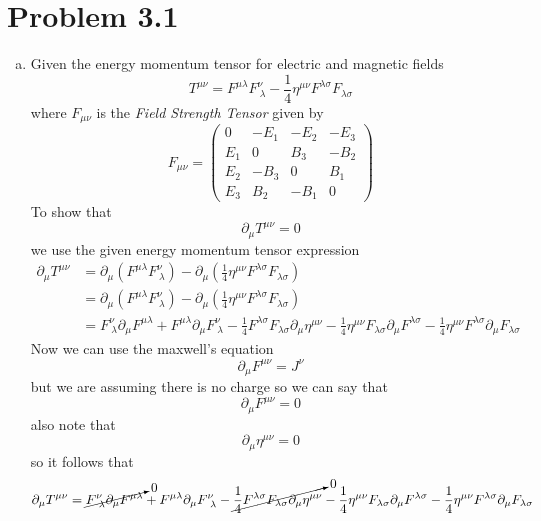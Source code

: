 \documentclass[11pt]{article}
\numberwithin{equation}{section}
\begin{document}


\section{Problem 3.1}
\begin{enumerate}[(a)]
\item
Given the energy momentum tensor for electric and magnetic fields
$$T^{\mu\nu} = F^{\mu\lambda}F^{\nu}_{\ \lambda} - \frac{1}{4}\eta^{\mu\nu}F^{\lambda\sigma}F_{\lambda\sigma}$$
where $F_{\mu\nu}$ is the \emph{Field Strength Tensor} given by
$$F_{\mu\nu} = \left(\begin{array}{cccc}
		0 &-E_1 &-E_2 &-E_3\\
		E_1 &0 &B_3 &-B_2\\
		E_2 &-B_3 &0 &B_1\\
		E_3 &B_2 &-B_1 &0
		\end{array}\right)$$
To show that 
$$\partial_{\mu}T^{\mu\nu} = 0$$
we use the given energy momentum tensor expression 
\begin{align*}
\partial_{\mu}T^{\mu\nu} &= \partial_{\mu}\left(F^{\mu\lambda}F^{\nu}_{\ \lambda}\right) - \partial_{\mu}\left(\frac{1}{4}\eta^{\mu\nu}F^{\lambda\sigma}F_{\lambda\sigma}\right)\\
&= \partial_{\mu}\left(F^{\mu\lambda}F^{\nu}_{\ \lambda}\right) - \partial_{\mu}\left(\frac{1}{4}\eta^{\mu\nu}F^{\lambda\sigma}F_{\lambda\sigma}\right)\\
&= F^{\nu}_{\ \lambda}\partial_{\mu}F^{\mu\lambda} + F^{\mu\lambda}\partial_{\mu}F^{\nu}_{\ \lambda} - \frac{1}{4}F^{\lambda\sigma}F_{\lambda\sigma}\partial_{\mu}\eta^{\mu\nu}- \frac{1}{4}\eta^{\mu\nu}F_{\lambda\sigma}\partial_{\mu}F^{\lambda\sigma} - \frac{1}{4}\eta^{\mu\nu}F^{\lambda\sigma}\partial_{\mu}F_{\lambda\sigma}
\end{align*}
Now we can use the maxwell's equation
$$\partial_{\mu}F^{\mu\nu} = J^{\nu}$$
but we are assuming there is no charge so we can say that 
$$\partial_{\mu}F^{\mu\nu} = 0$$
also note that 
$$\partial_{\mu}\eta^{\mu\nu} = 0$$
so it follows that
\begin{align*}
\partial_{\mu}T^{\mu\nu} &= \cancelto{0}{F^{\nu}_{\ \lambda}\partial_{\mu}F^{\mu\lambda}} + F^{\mu\lambda}\partial_{\mu}F^{\nu}_{\ \lambda} - \cancelto{0}{\frac{1}{4}F^{\lambda\sigma}F_{\lambda\sigma}\partial_{\mu}\eta^{\mu\nu}} - \frac{1}{4}\eta^{\mu\nu}F_{\lambda\sigma}\partial_{\mu}F^{\lambda\sigma} - \frac{1}{4}\eta^{\mu\nu}F^{\lambda\sigma}\partial_{\mu}F_{\lambda\sigma}\\

\end{align*}
\end{enumerate}
\end{document}
